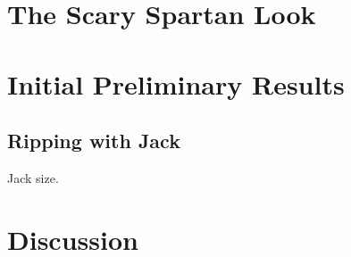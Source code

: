 \documentclass[preprint,10pt,nonatbib]{sigplanconf}
\begin{document}
\section{The Scary Spartan Look}
\label{section:look}




% 

\section{Initial Preliminary Results}
\label{section:initial}


\subsection{Ripping with Jack}
\label{section:jack}

Jack size.

\section{Discussion}
\label{section:zz}

\balance
\small

\end{document}
